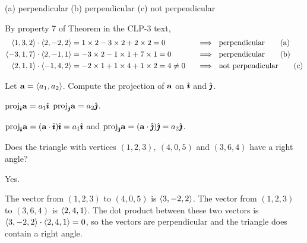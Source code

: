\begin{answer}
(a) perpendicular\qquad
(b) perpendicular\qquad
(c) not perpendicular
\end{answer}

\begin{solution}
\leqnomode
By property 7 of Theorem  in the CLP-3 text,
\begin{alignat*}{3}
\llt 1,3,2\rgt \cdot\llt 2,-2,2\rgt 
&=1\times2-3\times 2+2\times2=0\ 
&&\implies\ \text{perpendicular}
\tag{a} \\
\llt -3,1,7\rgt \cdot\llt 2,-1,1\rgt 
&=-3\times2-1\times 1+7\times1=0\ 
&&\implies\ \text{perpendicular}
\tag{b} \\
\llt 2,1,1\rgt \cdot\llt -1,4,2\rgt 
&=-2\times1+1\times 4+1\times2=4\ne 0\ 
&&\implies\ \text{not perpendicular}
\tag{c}
\end{alignat*}
\reqnomode
\end{solution}

\begin{question}
Let $\mathbf{a}=\left< a_1,a_2\right>$. Compute the projection of $\mathbf{a}$ on
$\hat{\pmb{\imath}}$ and $\hat{\pmb{\jmath}}$.
\end{question}


\begin{answer}
$\text{proj}_{\hat{\pmb{\imath}}}\mathbf{a}=a_1\hat{\pmb{\imath}}$\qquad
$\text{proj}_{\hat{\pmb{\jmath}}}\mathbf{a}=a_2\hat{\pmb{\jmath}}$.
\end{answer}

\begin{solution}
$\text{proj}_{\hat{\pmb{\imath}}}\mathbf{a}=(\mathbf{a}\cdot\hat{\pmb{\imath}})\hat{\pmb{\imath}}
=a_1\hat{\pmb{\imath}}$ and
$\text{proj}_{\hat{\pmb{\jmath}}}\mathbf{a}=(\mathbf{a}\cdot\hat{\pmb{\jmath}})\hat{\pmb{\jmath}}
=a_2\hat{\pmb{\jmath}}$.
\end{solution}

\begin{question}
Does the triangle with vertices $(1,2,3),\ (4,0,5)$ and $(3,6,4)$
have a right angle?
\end{question}


\begin{answer}
Yes.
\end{answer}

\begin{solution}
The vector from $(1,2,3)$ to $(4,0,5)$ is $\left< 3,-2,2\right>$.
The vector from $(1,2,3)$ to $(3,6,4)$ is $\left< 2,4,1\right>$.
The dot product between these two vectors is 
$\left< 3,-2,2\right>\cdot\left< 2,4,1\right>=0$,
so the vectors are perpendicular and the triangle does contain a right
angle.

\end{solution}

